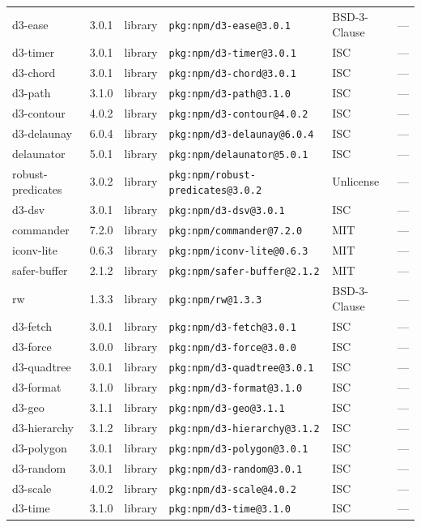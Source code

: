 \documentclass[11pt]{article}
\begin{document}
\begin{longtable}{|l|l|l|p{2.2cm}|l|p{4cm}|}
d3-ease & 3.0.1 & library & \texttt{pkg:npm/d3-ease@3.0.1} & BSD-3-Clause & — \\
d3-timer & 3.0.1 & library & \texttt{pkg:npm/d3-timer@3.0.1} & ISC & — \\
d3-chord & 3.0.1 & library & \texttt{pkg:npm/d3-chord@3.0.1} & ISC & — \\
d3-path & 3.1.0 & library & \texttt{pkg:npm/d3-path@3.1.0} & ISC & — \\
d3-contour & 4.0.2 & library & \texttt{pkg:npm/d3-contour@4.0.2} & ISC & — \\
d3-delaunay & 6.0.4 & library & \texttt{pkg:npm/d3-delaunay@6.0.4} & ISC & — \\
delaunator & 5.0.1 & library & \texttt{pkg:npm/delaunator@5.0.1} & ISC & — \\
robust-predicates & 3.0.2 & library & \texttt{pkg:npm/robust-predicates@3.0.2} & Unlicense & — \\
d3-dsv & 3.0.1 & library & \texttt{pkg:npm/d3-dsv@3.0.1} & ISC & — \\
commander & 7.2.0 & library & \texttt{pkg:npm/commander@7.2.0} & MIT & — \\
iconv-lite & 0.6.3 & library & \texttt{pkg:npm/iconv-lite@0.6.3} & MIT & — \\
safer-buffer & 2.1.2 & library & \texttt{pkg:npm/safer-buffer@2.1.2} & MIT & — \\
rw & 1.3.3 & library & \texttt{pkg:npm/rw@1.3.3} & BSD-3-Clause & — \\
d3-fetch & 3.0.1 & library & \texttt{pkg:npm/d3-fetch@3.0.1} & ISC & — \\
d3-force & 3.0.0 & library & \texttt{pkg:npm/d3-force@3.0.0} & ISC & — \\
d3-quadtree & 3.0.1 & library & \texttt{pkg:npm/d3-quadtree@3.0.1} & ISC & — \\
d3-format & 3.1.0 & library & \texttt{pkg:npm/d3-format@3.1.0} & ISC & — \\
d3-geo & 3.1.1 & library & \texttt{pkg:npm/d3-geo@3.1.1} & ISC & — \\
d3-hierarchy & 3.1.2 & library & \texttt{pkg:npm/d3-hierarchy@3.1.2} & ISC & — \\
d3-polygon & 3.0.1 & library & \texttt{pkg:npm/d3-polygon@3.0.1} & ISC & — \\
d3-random & 3.0.1 & library & \texttt{pkg:npm/d3-random@3.0.1} & ISC & — \\
d3-scale & 4.0.2 & library & \texttt{pkg:npm/d3-scale@4.0.2} & ISC & — \\
d3-time & 3.1.0 & library & \texttt{pkg:npm/d3-time@3.1.0} & ISC & — \\

\end{longtable}
\end{document}
